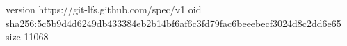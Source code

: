 version https://git-lfs.github.com/spec/v1
oid sha256:5c5b9d4d6249db433384eb2b14bf6af6c3fd79fac6beeebecf3024d8c2dd6e65
size 11068
